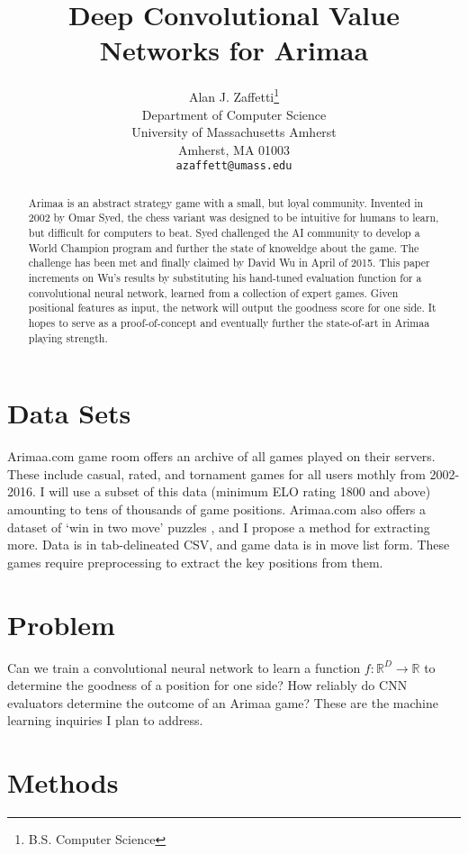 \documentclass{article}
\title{Deep Convolutional Value Networks for Arimaa}
\author{
Alan J. Zaffetti\thanks{B.S. Computer Science} \\
Department of Computer Science\\
University of Massachusetts Amherst\\
Amherst, MA 01003 \\
\texttt{azaffett@umass.edu} \\
}
\begin{document}
\maketitle
\begin{abstract}
Arimaa is an abstract strategy game with a small, but loyal community.  Invented in 2002 by Omar Syed, the chess variant was designed to be intuitive for humans to learn, but difficult for computers to beat.  Syed challenged the AI community to develop a World Champion program and further the state of knoweldge about the game.  The challenge has been met and finally claimed by David Wu in April of 2015.  This paper increments on Wu's results by substituting his hand-tuned evaluation function for a convolutional neural network, learned from a collection of expert games.  Given positional features as input, the network will output the goodness score for one side.  It hopes to serve as a proof-of-concept and eventually further the state-of-art in Arimaa playing strength.
\end{abstract}

\section{Data Sets}

Arimaa.com game room \cite{arimaa_com} offers an archive \cite{games} of all games played on their servers.  These include casual, rated, and tornament games for all users mothly from 2002-2016.  I will use a subset of this data (minimum ELO rating 1800 and above) amounting to tens of thousands of game positions.  Arimaa.com also offers a dataset of `win in two move' puzzles \cite{puzzles}, and I propose a method for extracting more.  Data is in tab-delineated CSV, and game data is in move list form.  These games require preprocessing to extract the key positions from them.

\section{Problem}

Can we train a convolutional neural network to learn a function $f: \mathbb{R}^D\rightarrow \mathbb{R}$ to determine the goodness of a position for one side? How reliably do CNN evaluators determine the outcome of an Arimaa game?  These are the machine learning inquiries I plan to address.

\section{Methods}
\end{document}
